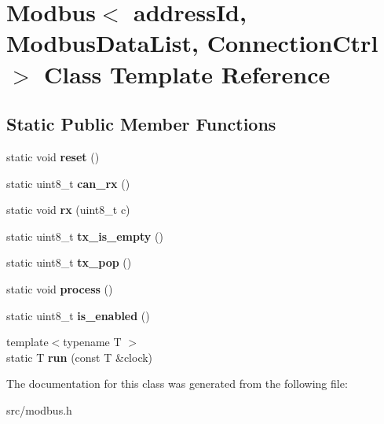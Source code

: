 \hypertarget{classModbus}{}\section{Modbus$<$ address\+Id, Modbus\+Data\+List, Connection\+Ctrl $>$ Class Template Reference}
\label{classModbus}
\subsection*{Static Public Member Functions}
\begin{DoxyCompactItemize}
\item 
\hypertarget{classModbus_af1b825d738f689a73996322cb97a3731}{}\label{classModbus_af1b825d738f689a73996322cb97a3731} 
static void {\bfseries reset} ()
\item 
\hypertarget{classModbus_aa01e2f99ffceaf529d50a046c181cb6f}{}\label{classModbus_aa01e2f99ffceaf529d50a046c181cb6f} 
static uint8\+\_\+t {\bfseries can\+\_\+rx} ()
\item 
\hypertarget{classModbus_af8c1c0ad33aae3f95654dde48e899dbe}{}\label{classModbus_af8c1c0ad33aae3f95654dde48e899dbe} 
static void {\bfseries rx} (uint8\+\_\+t c)
\item 
\hypertarget{classModbus_a0a043d814f91d12d22abeb756ec56391}{}\label{classModbus_a0a043d814f91d12d22abeb756ec56391} 
static uint8\+\_\+t {\bfseries tx\+\_\+is\+\_\+empty} ()
\item 
\hypertarget{classModbus_a13acf7f89171aeda9822d47d53cf178b}{}\label{classModbus_a13acf7f89171aeda9822d47d53cf178b} 
static uint8\+\_\+t {\bfseries tx\+\_\+pop} ()
\item 
\hypertarget{classModbus_a71101c24dca8e920e83baf536433c4c1}{}\label{classModbus_a71101c24dca8e920e83baf536433c4c1} 
static void {\bfseries process} ()
\item 
\hypertarget{classModbus_af486735a2aa3a896e02753bd58c6dd9a}{}\label{classModbus_af486735a2aa3a896e02753bd58c6dd9a} 
static uint8\+\_\+t {\bfseries is\+\_\+enabled} ()
\item 
\hypertarget{classModbus_a2d1a0d2149fd976590667356aa983343}{}\label{classModbus_a2d1a0d2149fd976590667356aa983343} 
{\footnotesize template$<$typename T $>$ }\\static T {\bfseries run} (const T \&clock)
\end{DoxyCompactItemize}


The documentation for this class was generated from the following file\+:\begin{DoxyCompactItemize}
\item 
src/modbus.\+h\end{DoxyCompactItemize}
